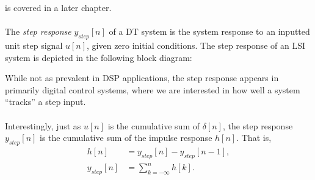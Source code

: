 \documentclass{report}
\begin{document}
is covered in a later chapter.
\\ \\
The \emph{step response} $y_{step}[n]$ of a DT system is the system response to an inputted unit step signal $u[n]$, given zero initial conditions. 
The step response of an LSI system is depicted in the following block diagram:
\begin{center}
\end{center}
While not as prevalent in DSP applications, the step response appears in primarily digital control systems, where 
we are interested in how well a system ``tracks'' a step input.
\\ \\
Interestingly, just as $u[n]$ is the cumulative sum of $\delta[n]$, the step response $y_{step}[n]$ is the cumulative sum of the impulse response $h[n]$. That is,
\begin{align}
    h[n] &= y_{step}[n] - y_{step}[n-1], \\
    y_{step}[n] &= \sum_{k=-\infty}^{n} h[k].
\end{align}
\end{document}
